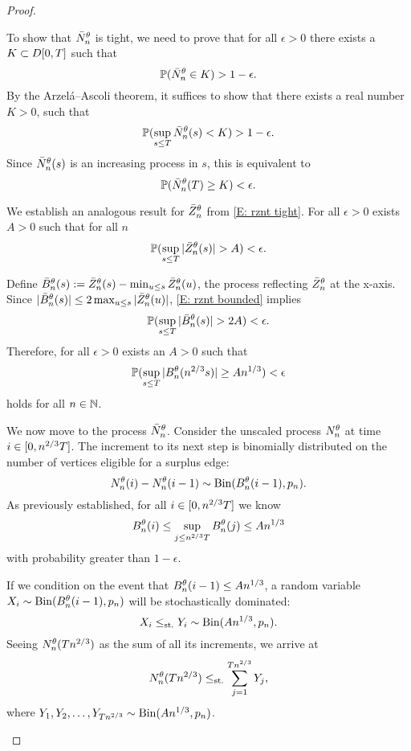 \begin{proof}
\begin{proofpart}
To show that $\bar{N}_n^{\theta}$ is tight, we need to prove that for all $\epsilon>0$ there exists a $K \subset D[0, T]$ such that
\begin{equation}
	\mathbb{P}(\bar{N}_n^{\theta} \in K) > 1 - \epsilon.
\end{equation}
By the Arzelá–Ascoli theorem, it suffices to show that there exists a real number $K>0$, such that
\begin{equation}
	\mathbb{P}( \sup_{s \leq T} \bar{N}_n^{\theta}(s) < K ) > 1 - \epsilon. 
\end{equation}
Since $\bar{N}_n^{\theta}(s)$ is an increasing process in $s$, this is equivalent to
\begin{equation}
	\mathbb{P}( \bar{N}_n^{\theta}(T) \geq K ) < \epsilon.
\end{equation}

We establish an analogous result for $\bar{Z}^{\theta}_n$ from \eqref{E: rznt tight}.
For all $\epsilon > 0$ exists $A>0$ such that for all $n$
\begin{equation} \label{E: rznt bounded}
\mathbb{P}(\sup_{s \leq T} |\bar{Z}^{\theta}_n(s)| > A) < \epsilon.
\end{equation}

Define $\bar{B}_n^{\theta}(s) := \bar{Z}^{\theta}_n(s) - \min_{u \leq s}\bar{Z}^{\theta}_n(u)$, the process reflecting $\bar{Z}^{\theta}_n$ at the x-axis.
Since $|\bar{B}_n^{\theta}(s)| \leq 2\max_{u \leq s}|\bar{Z}^{\theta}_n(u)|$, \eqref{E: rznt bounded} implies
\begin{equation} \label{E: rzminz bounded}
\mathbb{P}(\sup_{s \leq T} |\bar{B}_n^{\theta}(s)| > 2A) < \epsilon.
\end{equation}
Therefore, for all $\epsilon > 0$ exists an $A>0$ such that
\begin{equation}
\mathbb{P}( \sup_{s \leq T} |B_n^{\theta}(n^{2 / 3}s)| \geq An^{1 / 3} ) < \epsilon
\end{equation}
holds for all $n \in \mathbb{N}$.

We now move to the process $\bar{N}_n^{\theta}$. Consider the unscaled process $N_n^{\theta}$ at time $i \in [0, n^{2 / 3}T]$.
The increment to its next step is binomially distributed on the number of vertices eligible for a surplus edge:
\begin{equation}
N_n^{\theta}(i) - N_n^{\theta}(i-1) \sim \operatorname*{Bin}(B_n^{\theta}(i-1), p_n).
\end{equation}
As previously established, for all $i \in [0, n^{2 / 3}T]$ we know 
\begin{equation}
	B_n^{\theta}(i) \leq \sup_{j \leq n^{2 / 3}T} B_n^{\theta}(j) \leq An^{1 / 3}
\end{equation}
with probability greater than $1-\epsilon$.

If we condition on the event that $B_n^{\theta}(i-1) \leq An^{1 / 3}$, a random variable $X_i \sim \operatorname*{Bin}(B_n^{\theta}(i-1), p_n)$ will be stochastically dominated:
\begin{equation}
X_i \leq_{\text{st.}} Y_i \sim \operatorname*{Bin}(An^{1 / 3}, p_n).
\end{equation}
Seeing $N_n^{\theta}(Tn^{2 / 3})$ as the sum of all its increments, we arrive at
\begin{equation} \label{E: nnt stoch dominance}
N_n^{\theta}(Tn^{2 / 3}) \leq_{\text{st.}} \sum_{j=1}^{Tn^{2 / 3}} Y_j,
\end{equation}
where $Y_1, Y_2, \dots, Y_{Tn^{2 / 3}} \sim \operatorname*{Bin}(An^{1 / 3}, p_n)$.


\end{proofpart}
\end{proof}
